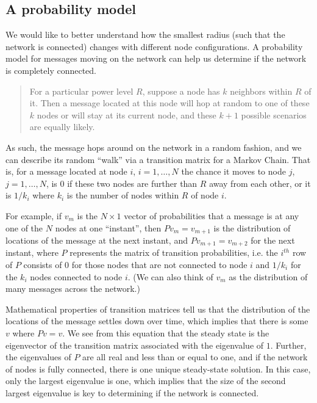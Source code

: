  

\subsection{A probability model}

We would like to better understand how the smallest radius (such that
the network is connected) changes with different node configurations.
A probability model for messages moving on the network can help us
determine if the network is completely connected.

\begin{quote}
For a particular power level $R$, suppose a node has $k$
neighbors within $R$ of it.  Then a message located at this node will
hop at random to one of these $k$ nodes or will stay at its current
node, and these $k+1$ possible scenarios are equally likely.
\end{quote}

As such, the message hops around on the network in a random fashion,
and we can describe its random ``walk'' via a transition matrix for a
Markov Chain.  That is, for a message located at node $i$, $i = 1,
\ldots , N$ the chance it moves to node $j$, $j = 1, \ldots , N$, is
$0$ if these two nodes are further than $R$ away from each other, or
it is $1/k_i$ where $k_i$ is the number of nodes within $R$ of node
$i$.

For example, if $v_m$ is the $N \times 1$ vector of probabilities that
a message is at any one of the $N$ nodes at one ``instant'', then $P
v_m = v_{m+1}$ is the distribution of locations of the message at the
next instant, and $P v_{m+1} = v_{m+2}$ for the next instant, where
$P$ represents the matrix of transition probabilities, i.e. the
$i^{th}$ row of $P$ consists of $0$ for those nodes that are not
connected to node $i$ and $1/k_i$ for the $k_i$ nodes connected to
node $i$.  (We can also think of $v_m$ as the distribution of many
messages across the network.)

Mathematical properties of transition matrices tell us that the
distribution of the locations of the message settles down over time,
which implies that there is some $v$ where $P v = v$.  We see from
this equation that the steady state is the eigenvector of the
transition matrix associated with the eigenvalue of $1$.  Further, the
eigenvalues of $P$ are all real and less than or equal to one, and if
the network of nodes is fully connected, there is one unique
steady-state solution.  In this case, only the largest eigenvalue is
one, which implies that the size of the second largest eigenvalue is
key to determining if the network is connected.

